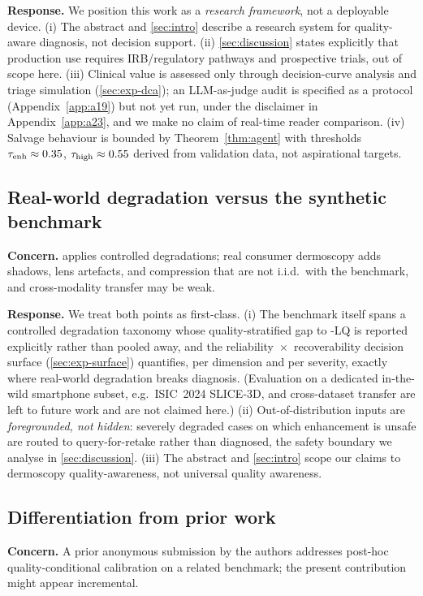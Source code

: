 \textbf{Response.} We position this work as a \emph{research framework}, not a deployable device.
(i) The abstract and \cref{sec:intro} describe a research system for quality-aware diagnosis, not
decision support. (ii) \cref{sec:discussion} states explicitly that production use requires
IRB/regulatory pathways and prospective trials, out of scope here. (iii) Clinical value is assessed
only through decision-curve analysis and triage simulation (\cref{sec:exp-dca}); an LLM-as-judge
audit is specified as a protocol (Appendix~\ref{app:a19}) but not yet run, under the disclaimer in
Appendix~\ref{app:a23}, and we make no claim of real-time reader comparison. (iv) Salvage behaviour is bounded by Theorem~\ref{thm:agent} with thresholds
$\tau_{\mathrm{enh}}\approx 0.35$, $\tau_{\mathrm{high}}\approx 0.55$ derived from validation data, not aspirational targets.

\subsection{Real-world degradation versus the synthetic benchmark}\label{app:a21-ood}
\textbf{Concern.} \itb applies controlled degradations; real consumer dermoscopy adds shadows, lens
artefacts, and compression that are not i.i.d.\ with the benchmark, and cross-modality transfer may
be weak.

\textbf{Response.} We treat both points as first-class. (i) The benchmark itself spans a
controlled degradation taxonomy whose quality-stratified gap to \itb-LQ is reported explicitly
rather than pooled away, and the reliability~$\times$~recoverability decision surface
(\cref{sec:exp-surface}) quantifies, per dimension and per severity, exactly where real-world
degradation breaks diagnosis. (Evaluation on a dedicated in-the-wild smartphone subset, e.g.\
ISIC~2024 SLICE-3D, and cross-dataset transfer are left to future work and are not claimed here.)
(ii) Out-of-distribution inputs are \emph{foregrounded, not hidden}: severely degraded cases on
which enhancement is unsafe are routed to query-for-retake rather than diagnosed, the safety
boundary we analyse in \cref{sec:discussion}. (iii) The abstract and \cref{sec:intro} scope our
claims to dermoscopy quality-awareness, not universal quality awareness.

\subsection{Differentiation from prior work}\label{app:a21-scope}
\textbf{Concern.} A prior anonymous submission by the authors addresses post-hoc quality-conditional
calibration on a related benchmark; the present contribution might appear incremental.

